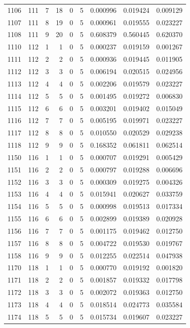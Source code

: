 \begin{longtable}{rrrrrrrrr}
1106 & 111 & 7 & 18 & 0 & 5 & 0.000996 & 0.019424 & 0.009129 \\
1107 & 111 & 8 & 19 & 0 & 5 & 0.000961 & 0.019555 & 0.023227 \\
1108 & 111 & 9 & 20 & 0 & 5 & 0.608379 & 0.560445 & 0.620370 \\
1110 & 112 & 1 & 1 & 0 & 5 & 0.000237 & 0.019159 & 0.001267 \\
1111 & 112 & 2 & 2 & 0 & 5 & 0.000936 & 0.019445 & 0.011905 \\
1112 & 112 & 3 & 3 & 0 & 5 & 0.006194 & 0.020515 & 0.024956 \\
1113 & 112 & 4 & 4 & 0 & 5 & 0.002206 & 0.019579 & 0.023227 \\
1114 & 112 & 5 & 5 & 0 & 5 & 0.001495 & 0.019272 & 0.006830 \\
1115 & 112 & 6 & 6 & 0 & 5 & 0.003201 & 0.019402 & 0.015049 \\
1116 & 112 & 7 & 7 & 0 & 5 & 0.005195 & 0.019971 & 0.023227 \\
1117 & 112 & 8 & 8 & 0 & 5 & 0.010550 & 0.020529 & 0.029238 \\
1118 & 112 & 9 & 9 & 0 & 5 & 0.168352 & 0.061811 & 0.062514 \\
1150 & 116 & 1 & 1 & 0 & 5 & 0.000707 & 0.019291 & 0.005429 \\
1151 & 116 & 2 & 2 & 0 & 5 & 0.000797 & 0.019288 & 0.006696 \\
1152 & 116 & 3 & 3 & 0 & 5 & 0.000309 & 0.019275 & 0.004326 \\
1153 & 116 & 4 & 4 & 0 & 5 & 0.015941 & 0.020627 & 0.033759 \\
1154 & 116 & 5 & 5 & 0 & 5 & 0.000998 & 0.019513 & 0.017334 \\
1155 & 116 & 6 & 6 & 0 & 5 & 0.002899 & 0.019389 & 0.020928 \\
1156 & 116 & 7 & 7 & 0 & 5 & 0.001175 & 0.019462 & 0.012750 \\
1157 & 116 & 8 & 8 & 0 & 5 & 0.004722 & 0.019530 & 0.019767 \\
1158 & 116 & 9 & 9 & 0 & 5 & 0.012255 & 0.022514 & 0.047938 \\
1170 & 118 & 1 & 1 & 0 & 5 & 0.000770 & 0.019192 & 0.001820 \\
1171 & 118 & 2 & 2 & 0 & 5 & 0.001857 & 0.019332 & 0.017798 \\
1172 & 118 & 3 & 3 & 0 & 5 & 0.002072 & 0.019363 & 0.012750 \\
1173 & 118 & 4 & 4 & 0 & 5 & 0.018514 & 0.024773 & 0.035584 \\
1174 & 118 & 5 & 5 & 0 & 5 & 0.015734 & 0.019607 & 0.023227 \\

\end{longtable}
